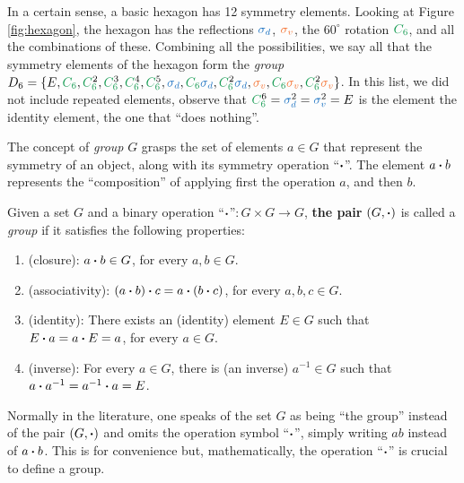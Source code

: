 In a certain sense, a basic hexagon has 12 symmetry elements. Looking at Figure \ref{fig:hexagon}, the hexagon has the reflections $\textcolor{RoyalBlue}{\sigma_d}$, $\textcolor{Orange}{\sigma_v}$, the $60^\circ$ rotation $\textcolor{ForestGreen}{C_6}$, and all the combinations of these. Combining all the possibilities, we say all that the symmetry elements of the hexagon form the \textit{group} $D_6 = \{E, \textcolor{ForestGreen}{C_6}, \textcolor{ForestGreen}{C_6^{\textcolor{black}{2}}}, \textcolor{ForestGreen}{C_6^{\textcolor{black}{3}}}, \textcolor{ForestGreen}{C_6^{\textcolor{black}{4}}}, \textcolor{ForestGreen}{C_6^{\textcolor{black}{5}}}, \textcolor{RoyalBlue}{\sigma_d}, \textcolor{ForestGreen}{C_6} \textcolor{RoyalBlue}{\sigma_d}, \textcolor{ForestGreen}{C_6^{\textcolor{black}{2}}} \textcolor{RoyalBlue}{\sigma_d}, \textcolor{Orange}{\sigma_v}, \textcolor{ForestGreen}{C_6} \textcolor{Orange}{\sigma_v}, \textcolor{ForestGreen}{C_6^{\textcolor{black}{2}}} \textcolor{Orange}{\sigma_v} \}$. In this list, we did not include repeated elements, observe that $\textcolor{ForestGreen}{C_6^{\textcolor{black}{6}}} = \textcolor{RoyalBlue}{\sigma_d^{\textcolor{black}{2}}} = \textcolor{RoyalBlue}{\sigma_v^{\textcolor{black}{2}}} = E$ is the element the identity element, the one that ``does nothing''.

\n

The concept of \textit{group} $G$ grasps the set of elements $a \in G$ that represent the symmetry of an object, along with its symmetry operation ``$\vdot$''. The element $a \vdot b$ represents the ``composition'' of applying first the operation $a$, and then $b$.

\begin{definition}
Given a set $G$ and a binary operation ``$\vdot$''$:G\times G \to G$, \textbf{the pair} $(G, \vdot)$ is called a \textit{group} if it satisfies the following properties:
\begin{enumerate}
\item (closure): $a \vdot b \in G$, for every $a, b \in G$.
\item (associativity): $(a \vdot b) \vdot c =  a \vdot (b \vdot c)$, for every $a, b, c \in G$.
\item (identity): There exists an (identity) element $E \in G$ such that $E \vdot a = a \vdot E = a$, for every $a \in G$.
\item (inverse): For every $a \in G$, there is (an inverse) $a^{-1} \in G$ such that $a \vdot a^{-1} = a^{-1} \vdot a = E$.
\end{enumerate}
Normally in the literature, one speaks of the set $G$ as being ``the group'' instead of the pair $(G, \vdot)$ and omits the operation symbol ``$\vdot$'', simply writing $ab$ instead of $a \vdot b$. This is for convenience but, mathematically, the operation ``$\vdot$'' is crucial to define a group.
\end{definition}

